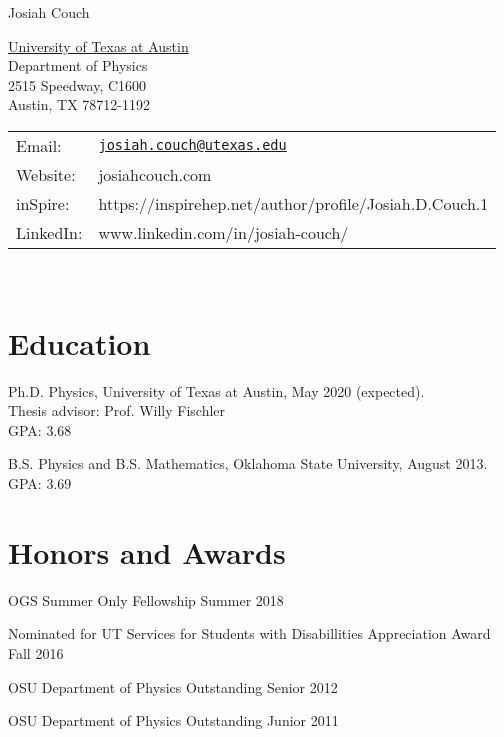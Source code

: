 \documentclass[letterpaper]{article}
\def\name{Josiah Couch}
\renewenvironment{itemize}{
  \begin{list}{}{
    \setlength{\leftmargin}{1.5em}
  }
}{
  \end{list}
}
\begin{document}
{\huge \name}


\vspace{0.25in}

\begin{minipage}{0.45\linewidth}
  \href{}{University of Texas at Austin} \\
  Department of Physics \\
  2515 Speedway, C1600 \\
  Austin, TX 78712-1192
\end{minipage}
\begin{minipage}{0.45\linewidth}
  \begin{tabular}{ll}
    Email: & \href{mailto:josiah.couch@utexas.edu}{\tt josiah.couch@utexas.edu} \\
    Website: & josiahcouch.com \\
    inSpire: & https://inspirehep.net/author/profile/Josiah.D.Couch.1\\
    LinkedIn: & www.linkedin.com/in/josiah-couch/ 
  \end{tabular}
\end{minipage}
\

\section*{Education}

\begin{itemize}

\item Ph.D. Physics, University of Texas at Austin, \hfill  May 2020 (expected).\\
  Thesis advisor: Prof. Willy Fischler\\
  GPA: 3.68
  
  
  \item B.S. Physics and B.S. Mathematics, Oklahoma State University, \hfill August 2013.\\
  GPA: 3.69

\end{itemize}

\section*{Honors and Awards}
\begin{itemize} \itemsep1pt \parskip0pt 

\item OGS Summer Only Fellowship \hfill{Summer 2018}

\item Nominated for UT Services for Students with Disabillities Appreciation Award \hfill{Fall 2016}

\item OSU Department of Physics Outstanding Senior \hfill{2012}

\item OSU Department of Physics Outstanding Junior \hfill{2011}
\end{itemize}
\end{document}
